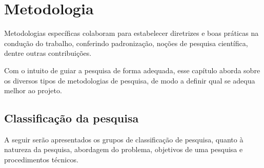 \chapter{Metodologia}
Metodologias específicas colaboram para estabelecer diretrizes e boas práticas na condução do trabalho, conferindo padronização, noções de pesquisa científica, dentre outras contribuições. \cite{Wohlin:2000}

Com o intuito de guiar a pesquisa de forma adequada, esse capítulo aborda sobre os diversos tipos de metodologias de pesquisa, de modo a definir qual se adequa melhor ao projeto.

%
%
\section{Classificação da pesquisa}
A seguir serão apresentados os grupos de classificação de pesquisa, quanto à natureza da pesquisa, abordagem do problema, objetivos de uma pesquisa e procedimentos técnicos.

